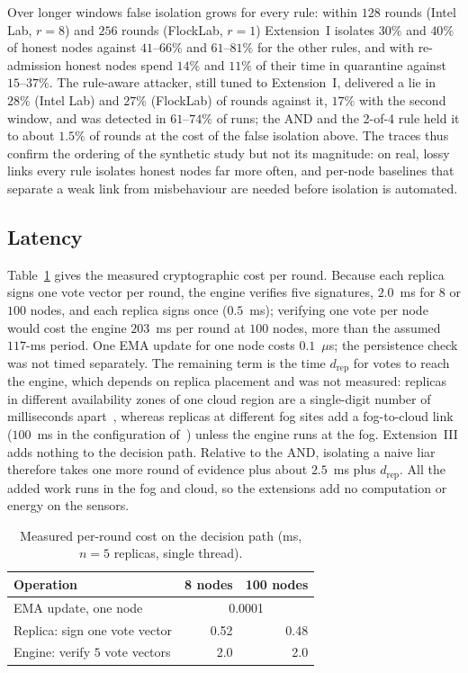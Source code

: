 \documentclass{ieeeaccess}
\begin{document}
Over longer windows false isolation grows for every rule: within $128$
rounds (Intel Lab, $r=8$) and $256$ rounds (FlockLab, $r=1$) Extension~I
isolates $30\%$ and $40\%$ of honest nodes against $41$--$66\%$ and
$61$--$81\%$ for the other rules, and with re-admission honest nodes
spend $14\%$ and $11\%$ of their time in quarantine against
$15$--$37\%$.  The rule-aware attacker, still tuned to Extension~I,
delivered a lie in $28\%$ (Intel Lab) and $27\%$ (FlockLab) of rounds
against it, $17\%$ with the second window, and was detected in
$61$--$74\%$ of runs; the AND and the 2-of-4 rule held it to about
$1.5\%$ of rounds at the cost of the false isolation above.  The
traces thus confirm the ordering of the synthetic study but not its
magnitude: on real, lossy links every rule isolates honest nodes far
more often, and per-node baselines that separate a weak link from
misbehaviour are needed before isolation is automated.

\subsection{Latency}
\label{sec:res-latency}
Table~\ref{tab:latency} gives the measured cryptographic cost per round.
Because each replica signs one vote vector per round, the engine
verifies five signatures, $2.0$~ms for $8$ or $100$ nodes, and each
replica signs once ($0.5$~ms); verifying one vote per node would cost the
engine $203$~ms per round at $100$ nodes, more than the assumed
$117$-ms period.  One EMA update for one node costs
$0.1$~$\mu$s; the persistence check was not timed separately.  The remaining term is the time
$d_{\mathrm{rep}}$ for votes to reach the engine, which depends on
replica placement and was not measured: replicas in different
availability zones of one cloud region are a single-digit number of
milliseconds apart~\cite{aws2024az}, whereas replicas at different fog
sites add a fog-to-cloud link ($100$~ms in the configuration
of~\cite{soula2024iodt}) unless the engine runs at the fog.
Extension~III adds nothing to the decision path.  Relative to the AND,
isolating a naive liar therefore takes one more round of evidence plus
about $2.5$~ms plus $d_{\mathrm{rep}}$.  All the added work runs in the
fog and cloud, so the extensions add no computation or energy on the
sensors.

\begin{table}[!t]
\caption{Measured per-round cost on the decision path (ms, $n=5$ replicas, single thread).}
\label{tab:latency}
\centering
\renewcommand{\arraystretch}{1.08}
\footnotesize
\setlength{\tabcolsep}{3pt}
\begin{tabular}{lrr}
\toprule
\textbf{Operation} & \textbf{8 nodes} & \textbf{100 nodes} \\
\midrule
EMA update, one node & \multicolumn{2}{c}{0.0001} \\
Replica: sign one vote vector & 0.52 & 0.48 \\
Engine: verify $5$ vote vectors & 2.0 & 2.0 \\
\bottomrule
\end{tabular}
\end{table}
\end{document}
